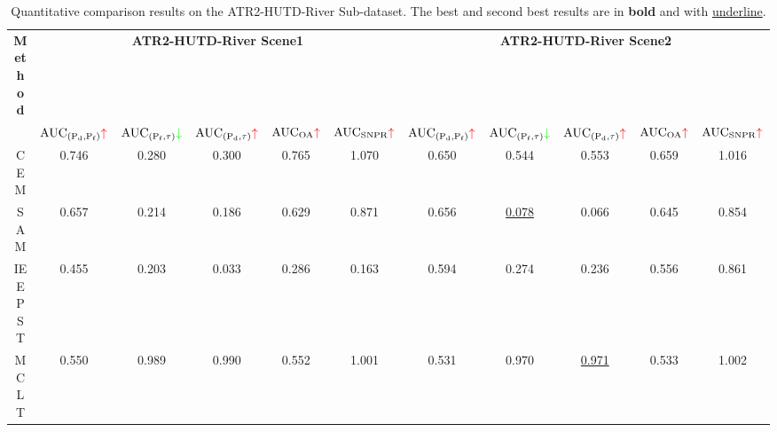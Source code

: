 \begin{table*}[!t] 
    \centering
    \footnotesize   
    \caption{Quantitative comparison results on the ATR2-HUTD-River Sub-dataset. The best and second best results are in \textbf{bold} and with \underline{underline}.} \label{auc_river}
    \renewcommand{\arraystretch}{1.5}
    \setlength{\tabcolsep}{1.85mm}
    \scalebox{0.875}
    {
        \begin{tabular}{ccccccccccc}
            \hline
            \multirow{2.4}{*}{\textbf{Method}} & \multicolumn{5}{c}{\cellcolor{tablecolor9}\textbf{ATR2-HUTD-River Scene1}}       & \multicolumn{5}{c}{\cellcolor{tablecolor10}\textbf{ATR2-HUTD-River Scene2}}       \\ \cmidrule(lr){2-6} \cmidrule(lr){7-11}
                                    & $\text{AUC}_{( \mathrm{P}_{\mathrm{d}},\mathrm{P}_{\mathrm{f}})}\textcolor{red}{\uparrow }$ & $\text{AUC}_{( \mathrm{P}_{\mathrm{f}}, \tau)}\textcolor{green}{\downarrow }$ & $\text{AUC}_{( \mathrm{P}_{\mathrm{d}},\tau)}\textcolor{red}{\uparrow }$ & $\mathrm{AUC}_{\mathrm{OA}} \textcolor{red}{\uparrow }$ & $\mathrm{AUC}_{\mathrm{SNPR}}\textcolor{red}{\uparrow }$ & $\text{AUC}_{( \mathrm{P}_{\mathrm{d}},\mathrm{P}_{\mathrm{f}})}\textcolor{red}{\uparrow }$ & $\text{AUC}_{( \mathrm{P}_{\mathrm{f}}, \tau)}\textcolor{green}{\downarrow }$ & $\text{AUC}_{( \mathrm{P}_{\mathrm{d}},\tau)}\textcolor{red}{\uparrow }$ & $\mathrm{AUC}_{\mathrm{OA}} \textcolor{red}{\uparrow }$ & $\mathrm{AUC}_{\mathrm{SNPR}}\textcolor{red}{\uparrow }$ \\ \hline
                                    CEM         & 0.746          & 0.280          & 0.300          & 0.765          & 1.070          & 0.650          & 0.544          & 0.553          & 0.659          & 1.016          \\
                                    SAM         & 0.657          & 0.214          & 0.186          & 0.629          & 0.871          & 0.656          & \underline{0.078}    & 0.066          & 0.645          & 0.854          \\
                                    IEEPST      & 0.455          & 0.203          & 0.033          & 0.286          & 0.163          & 0.594          & 0.274          & 0.236          & 0.556          & 0.861          \\
                                    MCLT        & 0.550          & 0.989          & 0.990          & 0.552          & 1.001          & 0.531          & 0.970          & \underline{0.971}    & 0.533          & 1.002          \\

\end{tabular}}
\end{table*}
